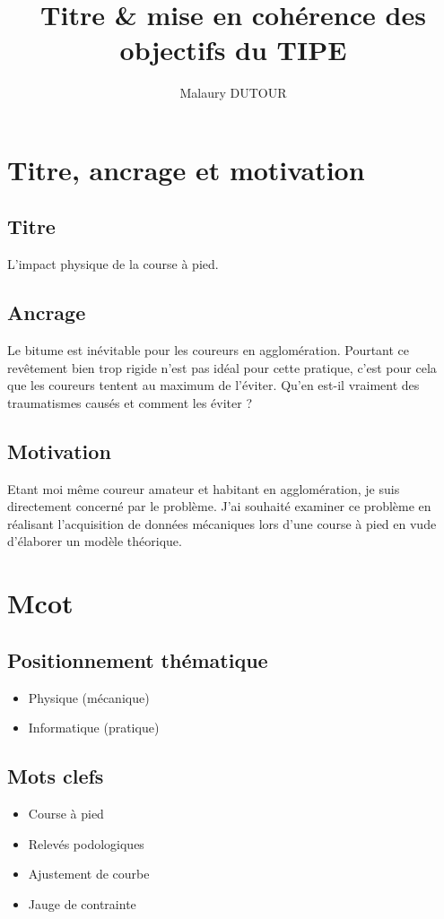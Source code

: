 \documentclass[11pt]{article}
\author{Malaury DUTOUR}
\date{}
\title{Titre \& mise en cohérence des objectifs du TIPE}
\begin{document}
\maketitle

\section{Titre, ancrage et motivation}
\label{sec:orgfb54d1e}
\subsection{Titre}
\label{sec:org01d3945}
L'impact physique de la course à pied.\\\empty
\subsection{Ancrage}
\label{sec:org0f0d5e1}
Le bitume est inévitable pour les coureurs en agglomération. Pourtant ce revêtement bien trop rigide n'est pas idéal pour cette pratique, c'est pour cela que les coureurs tentent au maximum de l'éviter. Qu'en est-il vraiment des traumatismes causés et comment les éviter ?\\\empty
\subsection{Motivation}
\label{sec:org4c2e1d1}
Etant moi même coureur amateur et habitant en agglomération, je suis directement concerné par le problème. J'ai souhaité examiner ce problème en réalisant l'acquisition de données mécaniques lors d'une course à pied en vude d'élaborer un modèle théorique.\\\empty
\section{Mcot}
\label{sec:org5b9b3ef}
\subsection{Positionnement thématique}
\label{sec:org664e08a}
\begin{itemize}
\item Physique (mécanique)\\\empty
\item Informatique (pratique)\\\empty
\end{itemize}
\subsection{Mots clefs}
\label{sec:orgf5f9e06}
\begin{itemize}
\item Course à pied\\\empty
\item Relevés podologiques\\\empty
\item Ajustement de courbe\\\empty
\item Jauge de contrainte\\\empty
\end{itemize}
\end{document}

